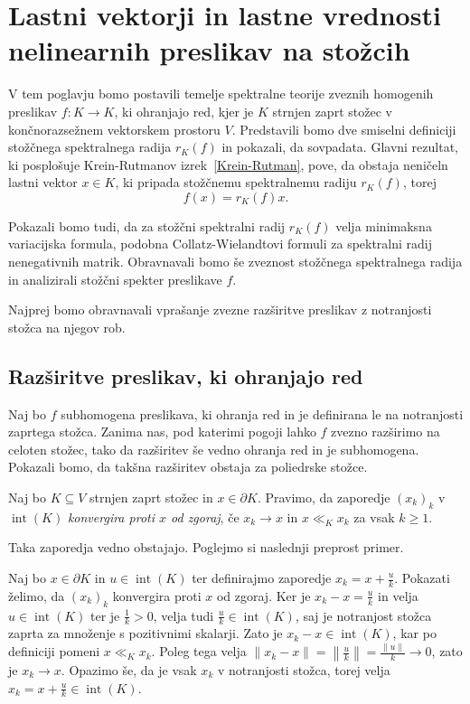 \documentclass[mat2, tisk]{fmfdelo}
\begin{document}
\section{Lastni vektorji in lastne vrednosti nelinearnih preslikav na stožcih}

V tem poglavju bomo postavili temelje spektralne teorije zveznih homogenih
preslikav $f\colon K\longrightarrow K$, ki ohranjajo red, kjer je $K$
strnjen zaprt stožec v končnorazsežnem vektorskem prostoru $V$.
Predstavili bomo dve smiselni definiciji stožčnega spektralnega radija 
$r_K(f)$ in pokazali, da sovpadata. Glavni rezultat, ki posplošuje
Krein-Rutmanov izrek~\ref{Krein-Rutman}, pove, da obstaja neničeln lastni vektor $x\in K$,
ki pripada stožčnemu spektralnemu radiju $r_K(f)$, torej
\begin{equation*}
f(x)=r_K(f)x.
\end{equation*}

Pokazali bomo tudi, da za stožčni spektralni radij $r_K(f)$ velja
minimaksna variacijska formula, podobna Collatz-Wielandtovi formuli za
spektralni radij nenegativnih matrik. Obravnavali bomo še zveznost
stožčnega spektralnega radija in analizirali stožčni spekter
preslikave $f$.

Najprej bomo obravnavali vprašanje zvezne razširitve
preslikav z notranjosti stožca na njegov rob.

\subsection{Razširitve preslikav, ki ohranjajo red}

Naj bo $f$ subhomogena preslikava, ki ohranja red in je
definirana le na notranjosti zaprtega stožca. Zanima nas,
pod katerimi pogoji lahko $f$ zvezno razširimo na celoten
stožec, tako da razširitev še vedno ohranja red in je
subhomogena. Pokazali bomo, da takšna razširitev obstaja
za poliedrske stožce.

\begin{definicija}
  Naj bo $K\subseteq V$ strnjen zaprt stožec in $x\in\partial K$.
  Pravimo, da zaporedje $(x_k)_k$ v $\operatorname{int}(K)$
  \emph{konvergira proti $x$ od zgoraj}, če $x_k\longrightarrow x$ in
  $x\ll_K x_k$ za vsak $k\geq1$. 
\end{definicija}

Taka zaporedja vedno obstajajo. Poglejmo si naslednji preprost primer.
\begin{zgled}\label{zgled4.3}
  Naj bo $x\in\partial K$ in
  $u\in\operatorname{int}(K)$ ter definirajmo
  zaporedje $x_k=x+\frac{u}{k}$.
  Pokazati želimo, da $(x_k)_k$ konvergira proti $x$ od zgoraj.
  Ker je $x_k-x=\frac{u}{k}$ in velja $u\in\operatorname{int}(K)$ ter je $\frac{1}{k}>0$, 
  velja tudi $\frac{u}{k}\in\operatorname{int}(K)$, saj je notranjost stožca zaprta za množenje s 
  pozitivnimi skalarji. Zato je $x_k-x\in\operatorname{int}(K)$, kar po definiciji pomeni $x\ll_K x_k$.
  Poleg tega velja $\|x_k-x\|=\left\|\frac{u}{k}\right\|=\frac{\|u\|}{k}\longrightarrow0$, zato je 
  $x_k\longrightarrow x$.
  Opazimo še, da je vsak $x_k$ v notranjosti stožca, torej velja $x_k=x+\frac{u}{k}\in\operatorname{int}(K)$.
\end{zgled}
\end{document}
